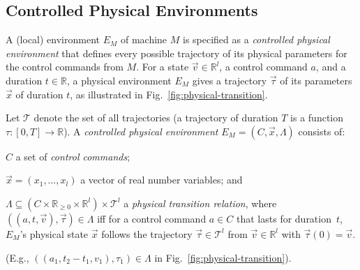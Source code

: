 \subsection{Controlled Physical Environments}



A (local)  %
environment $E_M$ of machine $M$
is specified as a   \emph{controlled physical environment}
that defines every possible trajectory of its physical parameters %
for the control commands from $M$.
%
For a state $\vec{v} \in \mathbb{R}^l$, a control command $a$, and a duration $t \in \mathbb{R}$,
a %
physical environment $E_M$
gives a trajectory $\vec{\tau}$ of its parameters $\vec{x}$ of duration $t$,
as illustrated in Fig.~\ref{fig:physical-transition}.

\begin{definition}
Let  $\mathcal{T}$ denote the set of all
trajectories (a trajectory of duration $T$ is a function $\tau : [0,T] \rightarrow \mathbb{R}$).
A \emph{controlled physical environment} $E_M = (C, \vec{x}, \Lambda)$ consists of:
\begin{inparaenum}[(i)]
    \item $C$ a set of \emph{control commands}; %
    \item $\vec{x} = (x_1, \ldots,x_l)$ a vector of real number variables; and
    \item $\Lambda \subseteq (C \times \mathbb{R}_{\geq 0} \times \mathbb{R}^l) \times \mathcal{T}^l$
    a \emph{physical transition relation}, where
    $((a, t, \vec{v}),  \vec{\tau}) \in \Lambda$
    iff for a control command $a \in C$ that lasts 
    for duration~$t$, 
    $E_M$'s physical state $\vec{x}$ follows the trajectory 
    $\vec{\tau} \in \mathcal{T}^l$
    from $\vec{v} \in \mathbb{R}^l$ with
        $\vec{\tau}(0) = \vec{v}$.
\end{inparaenum}
(E.g., $((a_1,t_2-t_1,v_1), \tau_1) \in \Lambda$ in Fig.~\ref{fig:physical-transition}).
\end{definition}

